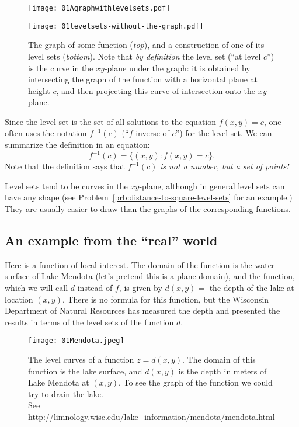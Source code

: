 \begin{figure}[h]
  \begin{center}
    \texttt{[image: 01Agraphwithlevelsets.pdf]}

    \texttt{[image: 01levelsets-without-the-graph.pdf]}
  \end{center}
  \caption{The graph of some function (\textit{top}), and a construction of one
  of its level sets (\textit{bottom}).  Note that \textit{by definition} the
  level set (``at level $c$'') is the curve in the $xy$-plane under the graph:
  it is obtained by intersecting the graph of the function with a horizontal
  plane at height $c$, and then projecting this curve of intersection onto the
  $xy$-plane.  }
  \label{fig:01Agraph}
\end{figure}

Since the level set is the set of all solutions to the equation $f(x,y)=c$, one
often uses the notation $f^{-1}(c)$ (``$f$-inverse of $c$'') for the level set.
We can summarize the definition in an equation:
\[
  f^{-1}(c)
  =
  \bigl\{ (x,y) : f(x,y) = c\bigr\}.
\]%
\marginwarning%
Note that the definition says that $f^{-1}(c)$ \emph{is not a number, but a set
of points!}

Level sets tend to be curves in the $xy$-plane, although in general level sets
can have any shape (see Problem~\ref{prb:distance-to-square-level-sets} for an
example.)  They are usually easier to draw than the graphs of the corresponding
functions.

\subsection{An example from the ``real'' world} 
\label{sec:01mendotaexample}  Here is a function of local interest.  The domain
of the function is the water surface of Lake Mendota (let's pretend this is a
plane domain), and the function, which we will call $d$ instead of $f$, is given
by $d(x, y) = $ the depth of the lake at location $(x, y)$.  There is no formula
for this function, but the Wisconsin Department of Natural Resources has
measured the depth and presented the results in terms of the level sets of the
function $d$.


\begin{figure}[ht]
  \texttt{[image: 01Mendota.jpeg]}
  \caption{  The level curves of a function $z=d(x, y)$.  The domain of this
  function is the lake surface, and $d(x, y)$ is the depth in meters of Lake
  Mendota at $(x, y)$.  To see the graph of the function we could try to drain the
  lake.\\
  \null\quad%
  See \url{http://limnology.wisc.edu/lake_information/mendota/mendota.html} }
\end{figure}

